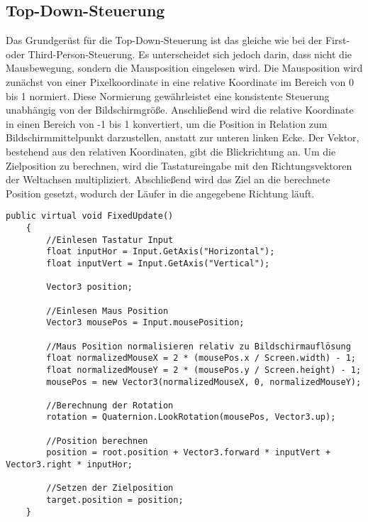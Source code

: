 \subsection{Top-Down-Steuerung}
Das Grundgerüst für die Top-Down-Steuerung ist das gleiche wie bei der First- oder Third-Person-Steuerung. Es unterscheidet sich jedoch darin, dass nicht die Mausbewegung, sondern die Mausposition eingelesen wird. Die Mausposition wird zunächst von einer Pixelkoordinate in eine relative Koordinate im Bereich von 0 bis 1 normiert. Diese Normierung gewährleistet eine konsistente Steuerung unabhängig von der Bildschirmgröße. Anschließend wird die relative Koordinate in einen Bereich von -1 bis 1 konvertiert, um die Position in Relation zum Bildschirmmittelpunkt darzustellen, anstatt zur unteren linken Ecke. Der Vektor, bestehend aus den relativen Koordinaten, gibt die Blickrichtung an. Um die Zielposition zu berechnen, wird die Tastatureingabe mit den Richtungsvektoren der Weltachsen multipliziert. Abschließend wird das Ziel an die berechnete Position gesetzt, wodurch der Läufer in die angegebene Richtung läuft.
\begin{lstlisting}[caption={Nutzersteuerung für Top-Down},captionpos=b,label={lst:nutzersteuerung_2}]
public virtual void FixedUpdate()
    {
        //Einlesen Tastatur Input
        float inputHor = Input.GetAxis("Horizontal");
        float inputVert = Input.GetAxis("Vertical");

        Vector3 position;

        //Einlesen Maus Position
        Vector3 mousePos = Input.mousePosition;

        //Maus Position normalisieren relativ zu Bildschirmauflösung
        float normalizedMouseX = 2 * (mousePos.x / Screen.width) - 1;
        float normalizedMouseY = 2 * (mousePos.y / Screen.height) - 1;
        mousePos = new Vector3(normalizedMouseX, 0, normalizedMouseY);

        //Berechnung der Rotation
        rotation = Quaternion.LookRotation(mousePos, Vector3.up);

        //Position berechnen
        position = root.position + Vector3.forward * inputVert + Vector3.right * inputHor;

        //Setzen der Zielposition
        target.position = position;
    }
\end{lstlisting}
